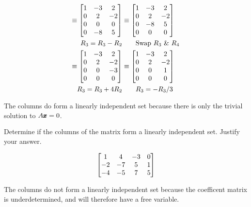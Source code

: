 \documentclass{../mathhomework}
\newenvironment{Mat}{\begin{bmatrix}}{\end{bmatrix}}
\begin{document}
\begin{problem}[1.7\#5]
\begin{solution}
\begin{align*}
            \equiv \begin{Mat}
                1 & -3 & 2 \\ 
                0 & 2 & -2 \\
                0 & 0 & 0 \\
                0 & -8 & 5
            \end{Mat} 
            & \equiv \begin{Mat}
                1 & -3 & 2 \\ 
                0 & 2 & -2 \\
                0 & -8 & 5 \\
                0 & 0 & 0 \\
            \end{Mat} 
            \\ 
            R_3 = R_3 - R_2 & \qquad{} \text{Swap $R_3$ \& $R_4$} \\
            \equiv \begin{Mat}
                1 & -3 & 2 \\ 
                0 & 2 & -2 \\
                0 & 0 & -3 \\
                0 & 0 & 0 \\
            \end{Mat}
            & \equiv \begin{Mat}
                1 & -3 & 2 \\ 
                0 & 2 & -2 \\
                0 & 0 & 1 \\
                0 & 0 & 0 \\
            \end{Mat}
            \\ 
            R_3 = R_3 + 4R_2 & \qquad{} R_3 = -R_3/3
        \end{align*}

        The columns do form a linearly independent set because there is only the trivial solution to $A\pmb{x} = 0$.
    \end{solution}
\end{problem}

\begin{problem}[1.7\#7]
    Determine if the columns of the matrix form a linearly independent set. Justify your answer.

    \begin{equation*}
        \begin{Mat}
            1 & 4 & -3 & 0 \\
            -2 & -7 & 5 & 1 \\
            -4 & -5 & 7 & 5
        \end{Mat}
    \end{equation*}

    \begin{solution}
        The columns do not form a linearly independent set because the coefficent matrix is underdetermined, and will therefore have a free variable.
    \end{solution}
\end{problem}
\end{document}

